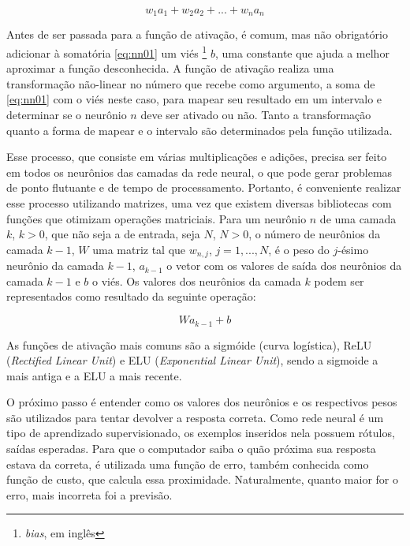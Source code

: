 \begin{equation} \label{eq:nn01}
w_{1}a_{1} + w_{2}a_{2} + ... + w_{n}a_{n}
\end{equation}

Antes de ser passada para a função de ativação, é comum, mas não obrigatório adicionar à somatória \ref{eq:nn01} um viés \footnote{\textit{bias}, em inglês} $b$, uma constante que ajuda a melhor aproximar a função desconhecida.
A função de ativação realiza uma transformação não-linear no número que recebe como argumento, a soma de \ref{eq:nn01} com o viés neste caso, para mapear seu resultado em um intervalo e determinar se o neurônio $n$ deve ser ativado ou não.
Tanto a transformação quanto a forma de mapear e o intervalo são determinados pela função utilizada.

Esse processo, que consiste em várias multiplicações e adições, precisa ser feito em todos os neurônios das camadas da rede neural, o que pode gerar problemas de ponto flutuante e de tempo de processamento.
Portanto, é conveniente realizar esse processo utilizando matrizes, uma vez que existem diversas bibliotecas com funções que otimizam operações matriciais.
Para um neurônio $n$ de uma camada $k$, $k > 0$, que não seja a de entrada, seja $N$, $N > 0$, o número de neurônios da camada $k-1$, $W$ uma matriz tal que $w_{n, j}$, $j = 1, ..., N$, é o peso do $j$-ésimo neurônio da camada $k-1$, $a_{k-1}$ o vetor com os valores de saída dos neurônios da camada $k-1$ e $b$ o viés.
Os valores dos neurônios da camada $k$ podem ser representados como resultado da seguinte operação:

\begin{equation} \label{eq:nn02}
Wa_{k-1} + b
\end{equation}

As funções de ativação mais comuns são a sigmóide (curva logística), ReLU (\textit{Rectified Linear Unit}) e ELU (\textit{Exponential Linear Unit}), sendo a sigmoide a mais antiga e a ELU a mais recente.

O próximo passo é entender como os valores dos neurônios e os respectivos pesos são utilizados para tentar devolver a resposta correta.
Como rede neural é um tipo de aprendizado supervisionado, os exemplos inseridos nela possuem rótulos, saídas esperadas.
Para que o computador saiba o quão próxima sua resposta estava da correta, é utilizada uma função de erro, também conhecida como função de custo, que calcula essa proximidade.
Naturalmente, quanto maior for o erro, mais incorreta foi a previsão.%

